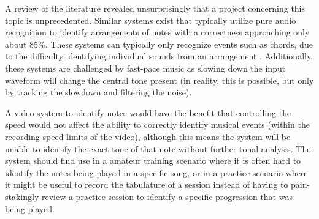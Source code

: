 A review of the literature revealed unsurprisingly that a project concerning this topic is unprecedented.
Similar systems exist that typically utilize pure audio recognition to identify arrangenents of notes with 
a correctness approaching only about 85\%.
These systems can typically only recognize events such as chords, due to the difficulty identifying individual sounds from an arrangement 
\cite{chordify,riffstation}.
Additionally, these systems are challenged by fast-pace music as slowing down the input waveform will change
the central tone present (in reality, this is possible, but only by tracking the slowdown and filtering the noise).
\par

A video system to identify notes would have the benefit that controlling the speed would not affect the
ability to correctly identify musical events (within the recording speed limits of the video),
although this means the system will be unable to identify the exact tone of that note without further tonal analysis.
The system should find use in a amateur training scenario where it is often hard to identify the notes being played in a specific song, 
or in a practice scenario where it might be useful to record the tabulature of a session
instead of having to pain-stakingly review a practice session to identify a specific progression that was being played.
